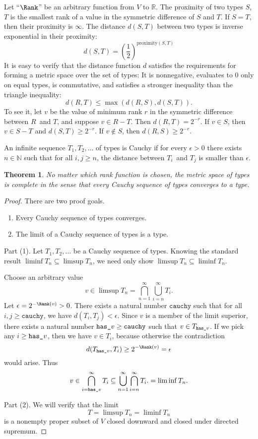\documentclass{amsart}
\newtheorem{theorem}[subsection]{Theorem}
\begin{document}

Let ``$\Rank$'' be an arbitrary function from $V$ to $\mathbb R$.
The proximity of two types $S$, $T$ is the smallest rank of a
value in the symmetric difference of $S$ and $T$. If $S=T$, then
their proximity is $\infty$. The distance $d(S, T)$ between two
types is inverse exponential in their proximity:
\[
d(S,T) =
\left(\frac12\right)^{\mathrm{proximity}(S, T)}
 \]
It is easy to verify that the distance function $d$ satisfies the
requirements for forming a metric space over the set of types:
It is nonnegative, evaluates to $0$ only on equal types, is
commutative, and satisfies a stronger inequality than the
triangle inequality:
\[
d(R,T)\le\max(d(R,S),d(S,T)).
\]
To see it, let $v$ be the value of minimum rank $r$ in the
symmetric difference between $R$~and $T$, and suppose $v\in R-T$.
Then $d(R, T)=2^{-r}$. If $v\in S$, then $v\in S-T$ and
$d(S,T)\ge2^{-r}$. If $v\notin S$, then $d(R, S)\ge2^{-r}$.


An infinite sequence $T_1,T_2,\ldots$ of types is Cauchy if for
every $\epsilon > 0$ there exists $n\in\mathbb N$ such that for
all $i,j\ge n$, the distance between $T_i$~and $T_j$ is smaller
than $\epsilon$.

\begin{theorem}
No matter which rank function is chosen, the metric space of
types is complete in the sense that every Cauchy sequence of
types converges to a type.
\end{theorem}

\begin{proof}
There are two proof goals.
\begin{enumerate}
\item Every Cauchy sequence of types converges.
\item The limit of a Cauchy sequence of types is a type.
\end{enumerate}

Part (1). Let $T_1,T_2,\ldots$ be a Cauchy sequence of types.
Knowing the standard result $\liminf T_n\subseteq\limsup T_n$,
we need only show $\limsup T_n\subseteq\liminf T_n$.

\def\Cauchy{\texttt{cauchy}}
\def\Hasv{{\texttt{has\textunderscore}v}}

Choose an arbitrary value
\[
v\in \limsup T_n = \bigcap_{n=1}^\infty\bigcup_{i = n}^\infty T_i.
\]
Let $\epsilon=2^{-\Rank(v)}>0$. There exists a natural number
$\Cauchy$ such that for all $i,j\ge\Cauchy$, we have
$d(T_i,T_j)<\epsilon$. Since $v$ is a member of the limit
superior, there exists a natural number $\Hasv\ge\Cauchy$ such
that $v\in T_\Hasv$. If we pick any $i\ge\Hasv$, then we have
$v\in T_i$, because otherwise the contradiction
\[
d(T_\Hasv, T_i)\ge2^{-\Rank(v)}=\epsilon
\]
would arise. Thus
\[
v\in
\bigcap_{i=\Hasv}^\infty T_i\subseteq
\bigcup_{n=1}^\infty\bigcap_{i = n}^\infty T_i.
=\liminf T_n.
\]

Part (2). We will verify that the limit
\[
T=\limsup T_n=\liminf T_n
\]
is a nonempty proper subset of $V$ closed downward and closed
under directed supremum.
\end{proof}
\end{document}
